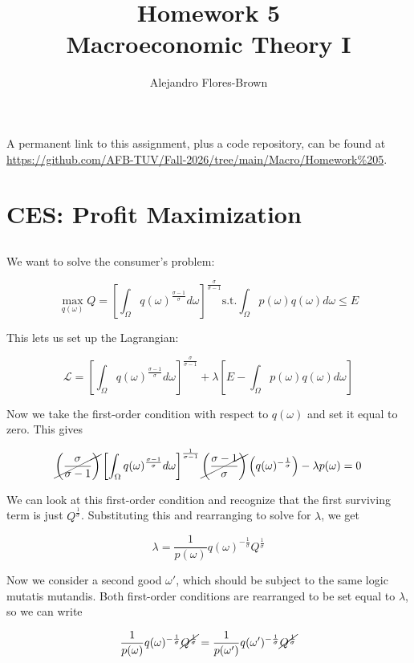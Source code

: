 \documentclass[12pt, letterpaper]{article}
\title{Homework 5 \\ Macroeconomic Theory I}
\author{Alejandro Flores-Brown}
\begin{document}
    \maketitle

	A permanent link to this assignment, plus a code repository, can be found at \url{https://github.com/AFB-TUV/Fall-2026/tree/main/Macro/Homework%205}.

    \section{CES: Profit Maximization}

    \subsection{}

    We want to solve the consumer's problem:

	\[ \max_{q(\omega)} Q = \left[ \int_{\Omega} q(\omega)^{\frac{\sigma - 1}{\sigma}} d\omega \right]^{\frac{\sigma}{\sigma - 1}} \text{s.t.} \int_\Omega p(\omega) q(\omega) d\omega \leq E   \]

	This lets us set up the Lagrangian:

	\[ \mathcal{L} = \left[ \int_{\Omega} q(\omega)^{\frac{\sigma - 1}{\sigma}} d\omega \right]^{\frac{\sigma}{\sigma - 1}} + \lambda \left[ E - \int_\Omega p(\omega) q(\omega) d\omega \right]    \]

	Now we take the first-order condition with respect to \(q(\omega)\) and set it equal to zero. This gives

	\[ \cancel{\left( \frac{\sigma}{\sigma - 1} \right)} \left[ \int_{\Omega} q(\omega)^{\frac{\sigma - 1}{\sigma}} d\omega \right]^{\frac{1}{\sigma - 1}} \cancel{\left( \frac{\sigma - 1}{\sigma} \right)} \left( q(\omega)^{-\frac{1}{\sigma}} \right) - \lambda p(\omega) = 0   \]

	We can look at this first-order condition and recognize that the first surviving term is just \( Q^{\frac{1}{\sigma}}  \). Substituting this and rearranging to solve for \(\lambda\), we get 

	\[ \lambda = \frac{1}{p(\omega)} q(\omega)^{-\frac{1}{\sigma}} Q^{\frac{1}{\sigma}}   \]

	Now we consider a second good \(\omega'\), which should be subject to the same logic mutatis mutandis. Both first-order conditions are rearranged to be set equal to \(\lambda\), so we can write

	\[ \frac{1}{p(\omega)} q(\omega)^{-\frac{1}{\sigma}} \cancel{Q^{\frac{1}{\sigma}}}  = \frac{1}{p(\omega')} q(\omega')^{-\frac{1}{\sigma}} \cancel{Q^{\frac{1}{\sigma}}}   \]
\end{document}
